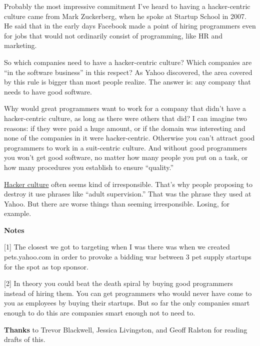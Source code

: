 Probably the most impressive commitment I've heard to having a
hacker-centric culture came from Mark Zuckerberg, when he spoke at
Startup School in 2007. He said that in the early days Facebook made a
point of hiring programmers even for jobs that would not ordinarily
consist of programming, like HR and marketing.

So which companies need to have a hacker-centric culture? Which
companies are ``in the software business'' in this respect? As Yahoo
discovered, the area covered by this rule is bigger than most people
realize. The answer is: any company that needs to have good software.

Why would great programmers want to work for a company that didn't have
a hacker-centric culture, as long as there were others that did? I can
imagine two reasons: if they were paid a huge amount, or if the domain
was interesting and none of the companies in it were hacker-centric.
Otherwise you can't attract good programmers to work in a suit-centric
culture. And without good programmers you won't get good software, no
matter how many people you put on a task, or how many procedures you
establish to ensure ``quality.''

\href{gba.html}{Hacker culture} often seems kind of irresponsible.
That's why people proposing to destroy it use phrases like ``adult
supervision.'' That was the phrase they used at Yahoo. But there are
worse things than seeming irresponsible. Losing, for example.

\textbf{Notes}

{[}1{]} The closest we got to targeting when I was there was when we
created pets.yahoo.com in order to provoke a bidding war between 3 pet
supply startups for the spot as top sponsor.

{[}2{]} In theory you could beat the death spiral by buying good
programmers instead of hiring them. You can get programmers who would
never have come to you as employees by buying their startups. But so far
the only companies smart enough to do this are companies smart enough
not to need to.

\textbf{Thanks} to Trevor Blackwell, Jessica Livingston, and Geoff
Ralston for reading drafts of this.
